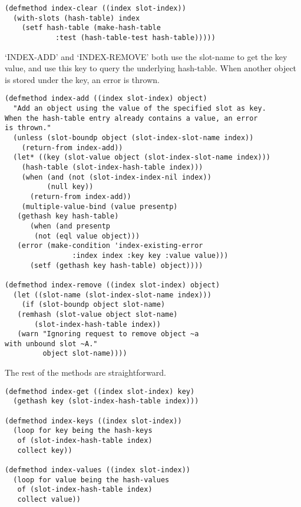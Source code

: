 \begin{Verbatim}[fontsize=\small,frame=leftline,framerule=0.9mm,rulecolor=\color{gray},framesep=5.1mm,xleftmargin=5mm,fontfamily=cmtt]
(defmethod index-clear ((index slot-index))
  (with-slots (hash-table) index
    (setf hash-table (make-hash-table
            :test (hash-table-test hash-table)))))
\end{Verbatim}
`INDEX-ADD' and `INDEX-REMOVE' both use the slot-name to get the
key value, and use this key to query the underlying
hash-table. When another object is stored under the key, an error
is thrown.

\begin{Verbatim}[fontsize=\small,frame=leftline,framerule=0.9mm,rulecolor=\color{gray},framesep=5.1mm,xleftmargin=5mm,fontfamily=cmtt]
(defmethod index-add ((index slot-index) object)
  "Add an object using the value of the specified slot as key.
When the hash-table entry already contains a value, an error
is thrown."
  (unless (slot-boundp object (slot-index-slot-name index))
    (return-from index-add))
  (let* ((key (slot-value object (slot-index-slot-name index)))
    (hash-table (slot-index-hash-table index)))
    (when (and (not (slot-index-index-nil index))
          (null key))
      (return-from index-add))
    (multiple-value-bind (value presentp)
   (gethash key hash-table)
      (when (and presentp
       (not (eql value object)))
   (error (make-condition 'index-existing-error
                :index index :key key :value value)))
      (setf (gethash key hash-table) object))))

(defmethod index-remove ((index slot-index) object)
  (let ((slot-name (slot-index-slot-name index)))
    (if (slot-boundp object slot-name)
   (remhash (slot-value object slot-name)
       (slot-index-hash-table index))
   (warn "Ignoring request to remove object ~a
with unbound slot ~A."
         object slot-name))))
\end{Verbatim}
The rest of the methods are straightforward.

\begin{Verbatim}[fontsize=\small,frame=leftline,framerule=0.9mm,rulecolor=\color{gray},framesep=5.1mm,xleftmargin=5mm,fontfamily=cmtt]
(defmethod index-get ((index slot-index) key)
  (gethash key (slot-index-hash-table index)))

(defmethod index-keys ((index slot-index))
  (loop for key being the hash-keys
   of (slot-index-hash-table index)
   collect key))

(defmethod index-values ((index slot-index))
  (loop for value being the hash-values
   of (slot-index-hash-table index)
   collect value))
\end{Verbatim}


